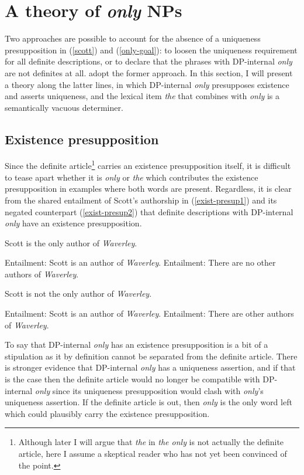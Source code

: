 \section{A theory of \textit{only} NPs \label{sec:my-theory}}
Two approaches are possible to account for the absence of a uniqueness presupposition in (\ref{scott}) and (\ref{only-goal}): to loosen the uniqueness requirement for all definite descriptions, or to declare that the phrases with DP-internal \textit{only} are not definites at all. \citeauthor{cb2015} adopt the former approach. In this section, I will present a theory along the latter lines, in which DP-internal \textit{only} presupposes existence and asserts uniqueness, and the lexical item \textit{the} that combines with \textit{only} is a semantically vacuous determiner.

\subsection{Existence presupposition}
Since the definite article\footnote{Although later I will argue that \textit{the} in \textit{the only} is not actually the definite article, here I assume a skeptical reader who has not yet been convinced of the point.} carries an existence presupposition itself, it is difficult to tease apart whether it is \textit{only} or \textit{the} which contributes the existence presupposition in examples where both words are present. Regardless, it is clear from the shared entailment of Scott's authorship in (\ref{exist-presup1}) and its negated counterpart (\ref{exist-presup2}) that definite descriptions with DP-internal \textit{only} have an existence presupposition.

\begin{exe}
	\ex \label{exist-presup1} Scott is the only author of \textit{Waverley}.
		\begin{xlist}
			\ex Entailment: Scott is an author of \textit{Waverley}.
			\ex Entailment: There are no other authors of \textit{Waverley}.
		\end{xlist}
	\ex \label{exist-presup2} Scott is not the only author of \textit{Waverley}.
		\begin{xlist}
			\ex Entailment: Scott is an author of \textit{Waverley}.
			\ex Entailment: There are other authors of \textit{Waverley}.
		\end{xlist}
\end{exe}

To say that DP-internal \textit{only} has an existence presupposition is a bit of a stipulation as it by definition cannot be separated from the definite article. There is stronger evidence that DP-internal \textit{only} has a uniqueness assertion, and if that is the case then the definite article would no longer be compatible with DP-internal \textit{only} since its uniqueness presupposition would clash with \textit{only}'s uniqueness assertion. If the definite article is out, then \textit{only} is the only word left which could plausibly carry the existence presupposition.

